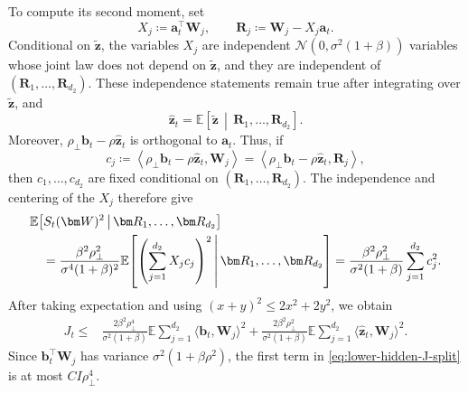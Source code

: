 \documentclass[11pt]{article}
\newcommand{\trans}{\top}
\begin{document}
To compute its second moment, set
\[
  X_j\coloneqq\bm a_t^\trans\bm W_j,
  \qquad
  \bm R_j\coloneqq\bm W_j-X_j\bm a_t.
\]
Conditional on $\widetilde{\bm z}$, the variables $X_j$ are independent
$\mathcal N(0,\sigma^2(1+\beta))$ variables whose joint law does not depend
on $\widetilde{\bm z}$, and they are independent of
$(\bm R_1,\ldots,\bm R_{d_2})$.  These independence statements remain true
after integrating over $\widetilde{\bm z}$, and
\begin{equation}
  \widehat{\bm z}_t
  =
  \mathbb E\!\left[
    \widetilde{\bm z}
    \,\middle|\,
    \bm R_1,\ldots,\bm R_{d_2}
  \right].
\label{eq:lower-hidden-posterior-residuals}
\end{equation}
Moreover, $\rho_\perp\bm b_t-\rho\widehat{\bm z}_t$ is orthogonal to
$\bm a_t$.  Thus, if
\begin{equation}
  c_j
  \coloneqq
  \left\langle
    \rho_\perp\bm b_t-\rho\widehat{\bm z}_t,\bm W_j
  \right\rangle
  =
  \left\langle
    \rho_\perp\bm b_t-\rho\widehat{\bm z}_t,\bm R_j
  \right\rangle,
\label{eq:lower-hidden-cj}
\end{equation}
then $c_1,\ldots,c_{d_2}$ are fixed conditional on
$(\bm R_1,\ldots,\bm R_{d_2})$.  The independence and centering of the
$X_j$ therefore give
\begin{align}
  &\mathbb E\!\left[
    S_t(\bm W)^2
    \,\middle|\,
    \bm R_1,\ldots,\bm R_{d_2}
  \right]
  \notag\\
  &\quad=
  \frac{\beta^2\rho_\perp^2}{\sigma^4(1+\beta)^2}
  \mathbb E\!\left[
    \left(\sum_{j=1}^{d_2}X_jc_j\right)^2
    \,\middle|\,
    \bm R_1,\ldots,\bm R_{d_2}
  \right]
  =
  \frac{\beta^2\rho_\perp^2}{\sigma^2(1+\beta)}
  \sum_{j=1}^{d_2}c_j^2.
\label{eq:lower-hidden-conditional-score-second-moment}
\end{align}
After taking expectation and using $(x+y)^2\le2x^2+2y^2$, we obtain
\begin{align}
  J_t
  \le{}&
  \frac{2\beta^2\rho_\perp^4}{\sigma^2(1+\beta)}
  \mathbb E\sum_{j=1}^{d_2}
  \langle\bm b_t,\bm W_j\rangle^2
  +
  \frac{2\beta^2\rho_\perp^2}{\sigma^2(1+\beta)}
  \mathbb E\sum_{j=1}^{d_2}
  \langle\widehat{\bm z}_t,\bm W_j\rangle^2.
\label{eq:lower-hidden-J-split}
\end{align}
Since $\bm b_t^\trans\bm W_j$ has variance
$\sigma^2(1+\beta\rho^2)$, the first term in
\cref{eq:lower-hidden-J-split} is at most $CI\rho_\perp^4$.
\end{document}
